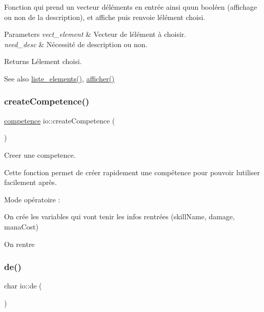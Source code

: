 Fonction qui prend un vecteur d\textquotesingle{}éléments en entrée ainsi qu\textquotesingle{}un booléen (affichage ou non de la description), et affiche puis renvoie l\textquotesingle{}élément choisi. 
\begin{DoxyParams}{Parameters}
{\em vect\+\_\+element} & Vecteur de l\textquotesingle{}élément à choisir. \\
\hline
{\em need\+\_\+desc} & Nécessité de description ou non. \\
\hline
\end{DoxyParams}
\begin{DoxyReturn}{Returns}
L\textquotesingle{}élement choisi. 
\end{DoxyReturn}
\begin{DoxySeeAlso}{See also}
\hyperlink{namespaceio_a0518bc32f1debefc2630431cd0c22cb0}{liste\+\_\+elements()}, \hyperlink{namespaceio_a0e3593d732c42572e8b3cb09ad21c4c9}{afficher()} 
\end{DoxySeeAlso}
\mbox{\label{namespaceio_a474f817675f4aa2e28f1dac572046eb5}} 
\subsubsection{\texorpdfstring{create\+Competence()}{createCompetence()}}
{\footnotesize\ttfamily \hyperlink{classcompetence}{competence} io\+::create\+Competence (\begin{DoxyParamCaption}{ }\end{DoxyParamCaption})}



Creer une competence. 

Cette fonction permet de créer rapidement une compétence pour pouvoir l\textquotesingle{}utiliser facilement après.

Mode opératoire \+:
\begin{DoxyItemize}
\item On crée les variables qui vont tenir les infos rentrées (skill\+Name, damage, mana\+Cost)
\item On rentre 
\end{DoxyItemize}\mbox{\label{namespaceio_ae9908b55f26f07e78043d7cfad003d22}} 
\subsubsection{\texorpdfstring{de()}{de()}}
{\footnotesize\ttfamily char io\+::de (\begin{DoxyParamCaption}{ }\end{DoxyParamCaption})}



